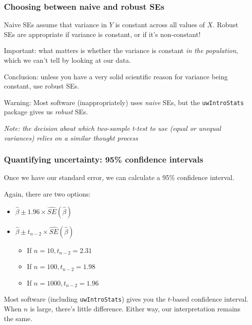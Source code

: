\documentclass[12pt, 
hyperref={colorlinks=true, linkcolor=blue, urlcolor=cyan}]{beamer}
\begin{document}
\begin{frame}
\frametitle{Choosing between naive and robust SEs}

Naive SEs assume that variance in $Y$ is constant across all values of $X$. Robust SEs are appropriate if variance is constant, or if it's non-constant!

\color{blue} Important: \color{black} what matters is whether the variance is constant \textit{in the population}, which we can't tell by looking at our data.

\color{blue} Conclusion: \color{black} unless you have a very solid scientific reason for variance being constant, use robust SEs.

\color{red} Warning: \color{black} Most software (inappropriately) uses \textit{naive} SEs, but the \texttt{uwIntroStats} package gives us \textit{robust} SEs. %

\begin{footnotesize} \textit{Note: the decision about which two-sample t-test to use (equal or unequal variances) relies on a similar thought process} \end{footnotesize}
\end{frame}


\begin{frame}
\frametitle{Quantifying uncertainty: 95\% confidence intervals}

Once we have our standard error, we can calculate a 95\% confidence interval. 

Again, there are two options: \vspace{-0.3cm}
\begin{itemize}
\item $\hat{\beta} \pm 1.96 \times \widehat{SE}(\hat\beta)$
\item $\hat{\beta} \pm t_{n-2} \times \widehat{SE}(\hat\beta)$
	\begin{itemize}
	\item If $n = 10, t_{n-2} = 2.31$
	\item If $n = 100, t_{n-2} = 1.98$
	\item If $n = 1000, t_{n-2} = 1.96$
	\end{itemize}
\end{itemize}

Most software (including \texttt{uwIntroStats}) gives you the $t$-based confidence interval. When $n$ is large, there's little difference. Either way, our interpretation remains the same.

\end{frame}
\end{document}

